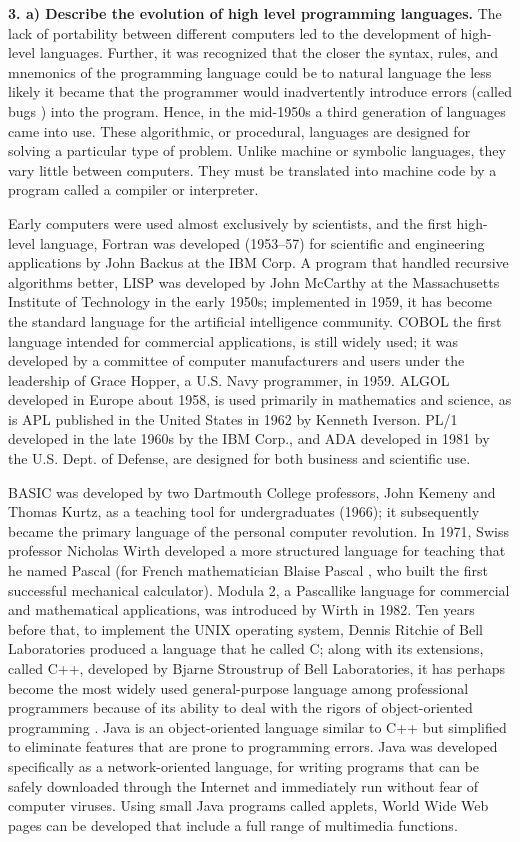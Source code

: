 \documentclass [12pt, a4paper]{article}
\begin{document}
\large
\textbf{3. a) Describe the evolution of high level programming languages.}
\normalsize
The lack of portability between different computers led to the development of high-level languages. Further, it was recognized that the closer the syntax, rules, and mnemonics of the programming language could be to  natural language  the less likely it became that the programmer would inadvertently introduce errors (called  bugs ) into the program. Hence, in the mid-1950s a third generation of languages came into use. These algorithmic, or procedural, languages are designed for solving a particular type of problem. Unlike machine or symbolic languages, they vary little between computers. They must be translated into machine code by a program called a compiler or interpreter.\\
\par
Early computers were used almost exclusively by scientists, and the first high-level language, Fortran was developed (1953–57) for scientific and engineering applications by John Backus at the IBM Corp. A program that handled recursive algorithms better, LISP was developed by John McCarthy at the Massachusetts Institute of Technology in the early 1950s; implemented in 1959, it has become the standard language for the artificial intelligence community. COBOL the first language intended for commercial applications, is still widely used; it was developed by a committee of computer manufacturers and users under the leadership of Grace Hopper, a U.S. Navy programmer, in 1959. ALGOL developed in Europe about 1958, is used primarily in mathematics and science, as is APL published in the United States in 1962 by Kenneth Iverson. PL/1 developed in the late 1960s by the IBM Corp., and ADA developed in 1981 by the U.S. Dept. of Defense, are designed for both business and scientific use.\\
\par
BASIC was developed by two Dartmouth College professors, John Kemeny and Thomas Kurtz, as a teaching tool for undergraduates (1966); it subsequently became the primary language of the personal computer revolution. In 1971, Swiss professor Nicholas Wirth developed a more structured language for teaching that he named Pascal (for French mathematician Blaise Pascal , who built the first successful mechanical calculator). Modula 2, a Pascallike language for commercial and mathematical applications, was introduced by Wirth in 1982. Ten years before that, to implement the UNIX operating system, Dennis Ritchie of Bell Laboratories produced a language that he called C; along with its extensions, called C++, developed by Bjarne Stroustrup of Bell Laboratories, it has perhaps become the most widely used general-purpose language among professional programmers because of its ability to deal with the rigors of object-oriented programming . Java is an object-oriented language similar to C++ but simplified to eliminate features that are prone to programming errors. Java was developed specifically as a network-oriented language, for writing programs that can be safely downloaded through the Internet and immediately run without fear of computer viruses. Using small Java programs called applets, World Wide Web pages can be developed that include a full range of multimedia functions.\\
\end{document}
